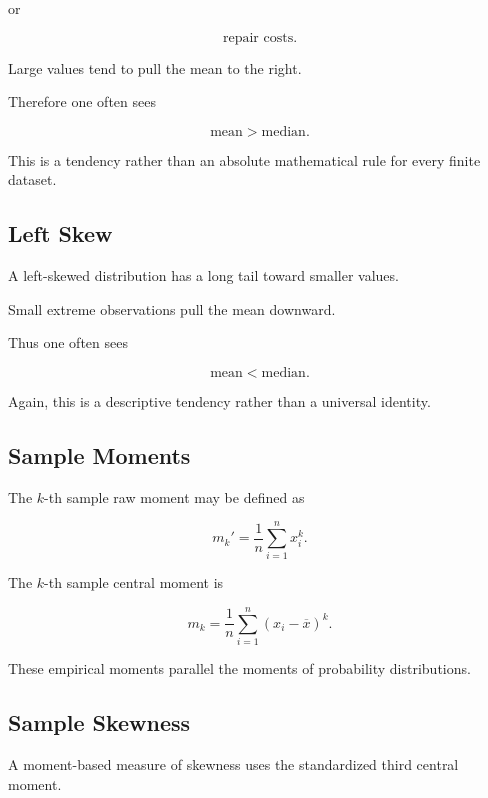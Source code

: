 or

\[
\text{repair costs}.
\]

Large values tend to pull the mean to the right.

Therefore one often sees

\[
\boxed{
\text{mean}
>
\text{median}.
}
\]

This is a tendency rather than an absolute mathematical rule for every
finite dataset.

\subsection{Left Skew}
\label{subsec:left-skew}

A left-skewed distribution has a long tail toward smaller values.

Small extreme observations pull the mean downward.

Thus one often sees

\[
\boxed{
\text{mean}
<
\text{median}.
}
\]

Again, this is a descriptive tendency rather than a universal identity.

\subsection{Sample Moments}
\label{subsec:sample-moments}

The \(k\)-th sample raw moment may be defined as

\[
\boxed{
m_k'
=
\frac1n
\sum_{i=1}^{n}
x_i^k.
}
\]

The \(k\)-th sample central moment is

\[
\boxed{
m_k
=
\frac1n
\sum_{i=1}^{n}
(x_i-\overline{x})^k.
}
\]

These empirical moments parallel the moments of probability
distributions.

\subsection{Sample Skewness}
\label{subsec:sample-skewness}

A moment-based measure of skewness uses the standardized third central
moment.

